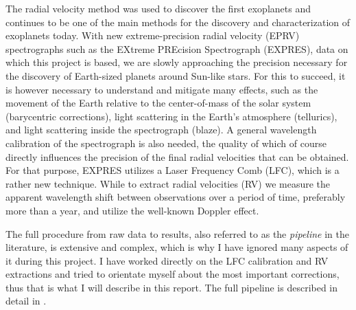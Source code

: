 The radial velocity method was used to discover the first exoplanets and continues to be one of the main methods for the discovery and characterization of exoplanets today\cite{radial_velocity_techniques}. With new extreme-precision radial velocity (EPRV) spectrographs such as the EXtreme PREcision Spectrograph (EXPRES), data on which this project is based, we are slowly approaching the precision necessary for the discovery of Earth-sized planets around Sun-like stars. For this to succeed, it is however necessary to understand and mitigate many effects, such as the movement of the Earth relative to the center-of-mass of the solar system (barycentric corrections), light scattering in the Earth's atmosphere (tellurics), and light scattering inside the spectrograph (blaze). 
A general wavelength calibration of the spectrograph is also needed, the quality of which of course directly influences the precision of the final radial velocities that can be obtained. For that purpose, EXPRES utilizes a Laser Frequency Comb (LFC), which is a rather new technique. While to extract radial velocities (RV) we measure the apparent wavelength shift between observations over a period of time, preferably more than a year, and utilize the well-known Doppler effect. 

The full procedure from raw data to results, also referred to as the \emph{pipeline} in the literature, is extensive and complex, which is why I have ignored many aspects of it during this project. I have worked directly on the LFC calibration and RV extractions and tried to orientate myself about the most important corrections, thus that is what I will describe in this report. The full pipeline is described in detail in \cite{first_RV_from_EXPRES}. 